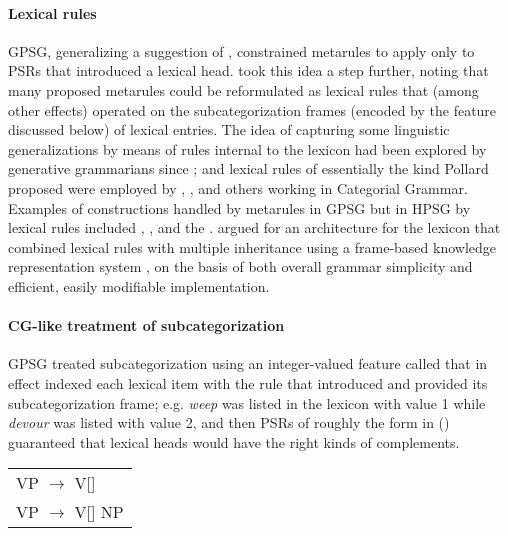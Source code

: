\documentclass[output=paper
 	        ,biblatex
                ,babelshorthands
                ,newtxmath
                ,draftmode
                ,colorlinks, citecolor=brown
]{langscibook}
\begin{document}
\paragraph*{Lexical rules} GPSG, generalizing a suggestion of \citet{Flickinger1983}, constrained metarules to apply only to PSRs that introduced a lexical head. \citet{Pollard85a-u} took this idea a step further, noting that many proposed metarules could be reformulated as lexical rules that (among other effects) operated on the subcategorization frames (encoded by the \subcat feature discussed below) of lexical entries. The idea of capturing some linguistic generalizations by means of rules internal to the lexicon had been explored by generative grammarians since \citet{Jackendoff75a}; and lexical rules of essentially the kind Pollard proposed were employed by \citet{Bach83}, \citet{Dowty78a}, and others working in Categorial Grammar. Examples of constructions handled by metarules in GPSG but in HPSG by lexical rules included , , and the . \citet*{FPW85a} argued for an architecture for the lexicon that combined lexical rules with multiple inheritance using a frame-based knowledge representation system \citep{Minsky1975}, on the basis of both overall grammar simplicity and efficient, easily modifiable implementation.

\paragraph*{CG-like treatment of subcategorization} GPSG treated subcategorization using an integer-valued feature called \subcat that in effect indexed each lexical item with the rule that introduced and provided its subcategorization frame; e.g. \emph{weep} was listed in the lexicon with \subcat value 1 while \emph{devour} was listed with \subcat value 2, and then PSRs of roughly the form in () guaranteed that lexical heads would have the right kinds of complements.
\ea
\begin{tabular}[t]{l}
          VP $\rightarrow$ V[\subcat 1] \\
          VP $\rightarrow$ V[\subcat 2] NP
\end{tabular}
\z
\end{document}
